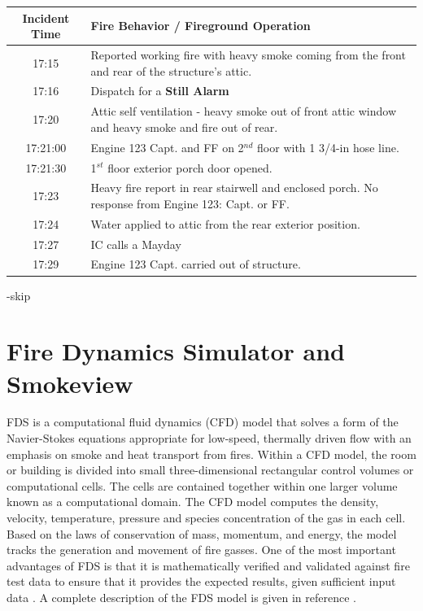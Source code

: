 \documentclass[11pt,oneside]{book}
\begin{document}
\bigskip 
\begin{minipage}{.8\linewidth}
\centering
{}\label{tab:fire_info}
\begin{tabular}{c m{0.25in}}
\toprule[1.5pt]
Incident Time & Fire Behavior / Fireground Operation  \\
\midrule
17:15    & Reported working fire with heavy smoke coming from the front and rear of the structure's attic. \\
17:16    & Dispatch for a {\bf Still Alarm} \\
17:20    & Attic self ventilation - heavy smoke out of front attic window and heavy smoke and fire out of rear. \\  
17:21:00 & Engine 123 Capt. and FF on 2$^{nd}$ floor with 1 3/4-in hose line. \\
17:21:30 & 1$^{st}$ floor exterior porch door opened. \\
17:23    & Heavy fire report in rear stairwell and enclosed porch. No response from Engine 123: Capt. or FF. \\
17:24    & Water applied to attic from the rear exterior position. \\
17:27    & IC calls a Mayday \\
17:29    & Engine 123 Capt. carried out of structure. \\
\bottomrule[1.25pt]
\end{tabular}\par
\big-skip
\end{minipage}
 

\chapter{Fire Dynamics Simulator and Smokeview}
FDS is a computational fluid dynamics (CFD) model that solves a form of the Navier-Stokes equations appropriate for low-speed, thermally driven flow with an emphasis on smoke and heat transport from fires.  Within a CFD model, the room or building is divided into small three-dimensional rectangular control volumes or computational cells.  The cells are contained together within one larger volume known as a computational domain.  The CFD model computes the density, velocity, temperature, pressure and species concentration of the gas in each cell.  Based on the laws of conservation of mass, momentum,  and energy, the model tracks the generation and movement of fire gasses. One of the most important advantages of FDS is that it is  mathematically verified \cite{FDS_Verification_Guide} and validated against fire test data to ensure that it provides the expected results, given sufficient input data \cite{FDS_Validation_Guide}.  A complete description of the FDS model is given in reference \cite{FDS_Math_Guide}.
\end{document}
